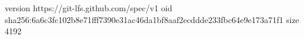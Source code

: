 version https://git-lfs.github.com/spec/v1
oid sha256:6a6c3fc102b8e71fff7390e31ac46da1bf8aaf2ecddde233fbc64e9e173a71f1
size 4192
